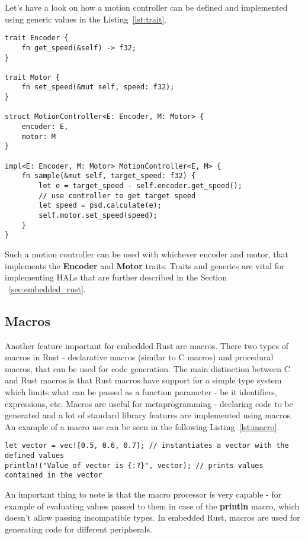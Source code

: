 Let's have a look on how a motion controller can be defined and implemented using generic values in the Listing~\ref{lst:trait}.

\begin{lstlisting}[caption={Using traits and generics for shared behavior in Rust.},label=lst:trait]
trait Encoder {
    fn get_speed(&self) -> f32;
}

trait Motor {
    fn set_speed(&mut self, speed: f32);
}

struct MotionController<E: Encoder, M: Motor> {
    encoder: E,
    motor: M
}

impl<E: Encoder, M: Motor> MotionController<E, M> {
    fn sample(&mut self, target_speed: f32) {
        let e = target_speed - self.encoder.get_speed();
        // use controller to get target speed
        let speed = psd.calculate(e);
        self.motor.set_speed(speed);
    }
}
\end{lstlisting}

Such a motion controller can be used with whichever encoder and motor, that implements the \textbf{Encoder} and \textbf{Motor} traits.
Traits and generics are vital for implementing HALs that are further described in the Section ~\ref{sec:embedded_rust}.

\newpage
\subsection{Macros}
\label{subsec:macros}
Another feature important for embedded Rust are macros.
There two types of macros in Rust - declarative macros (similar to C macros) and procedural macros, that can be used for code generation.
The main distinction between C and Rust macros is that Rust macros have support for a simple type system which limits what can be passed as a function parameter - be it identifiers, expressions, etc.
Macros are useful for metaprogramming - declaring code to be generated and a lot of standard library features are implemented using macros.
An example of a macro use can be seen in the following Listing~\ref{lst:macro}.
\begin{lstlisting}[caption={Using macros in Rust to initialize a vector and print its values.},label=lst:macro]
let vector = vec![0.5, 0.6, 0.7]; // instantiates a vector with the defined values
println!("Value of vector is {:?}", vector); // prints values contained in the vector
\end{lstlisting}

An important thing to note is that the macro processor is very capable - for example of evaluating values passed to them in case of the \textbf{println} macro, which doesn't allow passing incompatible types.
In embedded Rust, macros are used for generating code for different peripherals.

